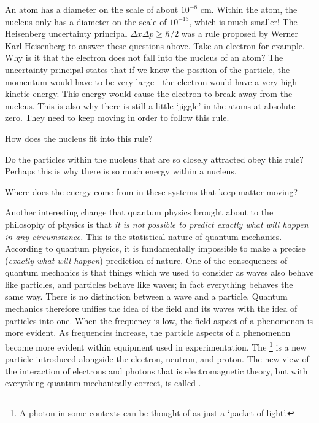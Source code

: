 An atom has a diameter on the scale of about $10^{-8}$ cm. Within the atom, the nucleus only has a diameter on the scale of $10^{-13}$, which is much smaller! The Heisenberg uncertainty principal $\Delta x \Delta p \geq \hbar/2$ was a rule proposed by Werner Karl Heisenberg to answer these questions above. Take an electron for example. Why is it that the electron does not fall into the nucleus of an atom? The uncertainty principal states that if we know the position of the particle, the momentum would have to be very large - the electron would have a very high kinetic energy. This energy would cause the electron to break away from the nucleus. This is also why there is still a little `jiggle' in the atoms at absolute zero. They need to keep moving in order to follow this rule.

\begin{questions}
	\item How does the nucleus fit into this rule?
	\item Do the particles within the nucleus that are so closely attracted obey this rule? Perhaps this is why there is so much energy within a nucleus.
	\item Where does the energy come from in these systems that keep matter moving?
\end{questions}

Another interesting change that quantum physics brought about to the philosophy of physics is that \textit{it is not possible to predict exactly what will happen in any circumstance.} This is the statistical nature of quantum mechanics. According to quantum physics, it is fundamentally impossible to make a precise (\textit{exactly what will happen}) prediction of nature. One of the consequences of quantum mechanics is that things which we used to consider as waves also behave like particles, and particles behave like waves; in fact everything behaves the same way. There is no distinction between a wave and a particle. Quantum mechanics therefore unifies the idea of the field and its waves with the idea of particles into one. When the frequency is low, the field aspect of a phenomenon is more evident. As frequencies increase, the particle aspects of a phenomenon become more evident within equipment used in experimentation. The \footnote{A photon in some contexts can be thought of as just a `packet of light'.} is a new particle introduced alongside the electron, neutron, and proton. The new view of the interaction of electrons and photons that is electromagnetic theory, but with everything quantum-mechanically correct, is called .


